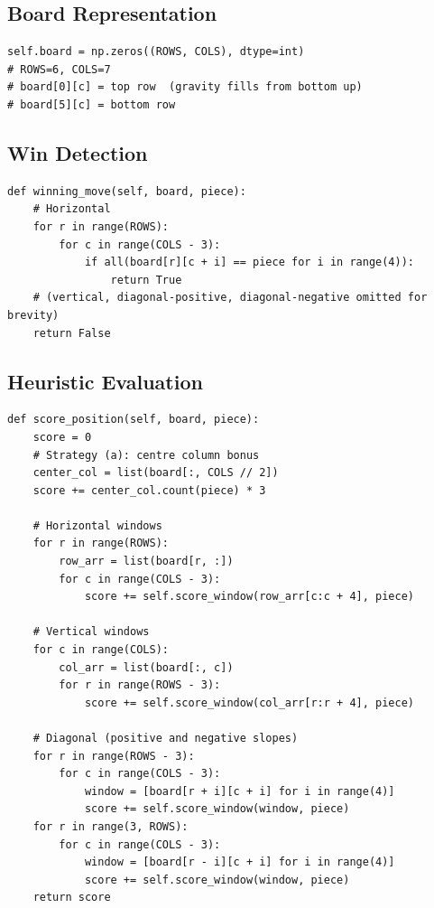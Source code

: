 \documentclass[12pt]{article}
\begin{document}
\subsection{Board Representation}

\begin{lstlisting}[caption={Board initialisation.}]
self.board = np.zeros((ROWS, COLS), dtype=int)
# ROWS=6, COLS=7
# board[0][c] = top row  (gravity fills from bottom up)
# board[5][c] = bottom row
\end{lstlisting}

\subsection{Win Detection}

\begin{lstlisting}[caption={winning\_move --- horizontal check shown as example.}]
def winning_move(self, board, piece):
    # Horizontal
    for r in range(ROWS):
        for c in range(COLS - 3):
            if all(board[r][c + i] == piece for i in range(4)):
                return True
    # (vertical, diagonal-positive, diagonal-negative omitted for brevity)
    return False
\end{lstlisting}

\subsection{Heuristic Evaluation}

\begin{lstlisting}[caption={score\_position --- full board evaluation.}]
def score_position(self, board, piece):
    score = 0
    # Strategy (a): centre column bonus
    center_col = list(board[:, COLS // 2])
    score += center_col.count(piece) * 3

    # Horizontal windows
    for r in range(ROWS):
        row_arr = list(board[r, :])
        for c in range(COLS - 3):
            score += self.score_window(row_arr[c:c + 4], piece)

    # Vertical windows
    for c in range(COLS):
        col_arr = list(board[:, c])
        for r in range(ROWS - 3):
            score += self.score_window(col_arr[r:r + 4], piece)

    # Diagonal (positive and negative slopes)
    for r in range(ROWS - 3):
        for c in range(COLS - 3):
            window = [board[r + i][c + i] for i in range(4)]
            score += self.score_window(window, piece)
    for r in range(3, ROWS):
        for c in range(COLS - 3):
            window = [board[r - i][c + i] for i in range(4)]
            score += self.score_window(window, piece)
    return score
\end{lstlisting}
\end{document}
